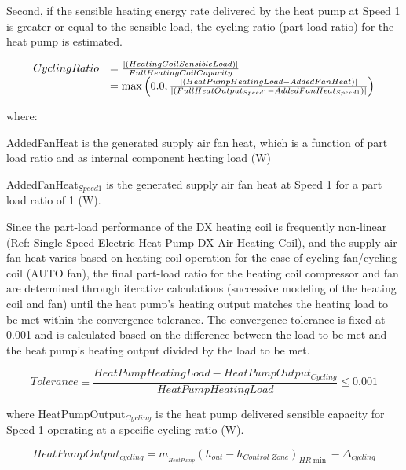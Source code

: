 Second, if the sensible heating energy rate delivered by the heat pump at Speed 1 is greater or equal to the sensible load, the cycling ratio (part-load ratio) for the heat pump is estimated.

\begin{equation}
  \begin{array}{rl}
    CyclingRatio &= \frac{\left|\left(HeatingCoilSensibleLoad\right)\right|}{FullHeatingCoilCapacity} \\
                 &= \max \left(0.0, \frac{\left|\left(HeatPumpHeatingLoad-AddedFanHeat\right)\right|}{\left|\left(FullHeatOutput_{Speed1}-AddedFanHeat_{Speed1}\right)\right|} \right)
  \end{array}
\label{eq:UnitaryMultiSpeedCyclingRatioHeating}
\end{equation}

where:

AddedFanHeat is the generated supply air fan heat, which is a function of part load ratio and as internal component heating load (W)

AddedFanHeat\(_{Speed1}\) is the generated supply air fan heat at Speed 1 for a part load ratio of 1 (W).

Since the part-load performance of the DX heating coil is frequently non-linear (Ref: Single-Speed Electric Heat Pump DX Air Heating Coil), and the supply air fan heat varies based on heating coil operation for the case of cycling fan/cycling coil (AUTO fan), the final part-load ratio for the heating coil compressor and fan are determined through iterative calculations (successive modeling of the heating coil and fan) until the heat pump's heating output matches the heating load to be met within the convergence tolerance. The convergence tolerance is fixed at 0.001 and is calculated based on the difference between the load to be met and the heat pump's heating output divided by the load to be met.

\begin{equation}
  Tolerance \equiv \frac{HeatPumpHeatingLoad - HeatPumpOutput_{Cycling}}{HeatPumpHeatingLoad} \leq 0.001
\end{equation}

where HeatPumpOutput\(_{Cycling}\) is the heat pump delivered sensible capacity for Speed 1 operating at a specific cycling ratio (W).

\begin{equation}
HeatPumpOutpu{t_{cycling}} = {\dot m_{_{HeatPump}}}{\left( {{h_{out}} - {h_{Control\;Zone}}} \right)_{HR\min }} - {\Delta_{cycling}}
\end{equation}


